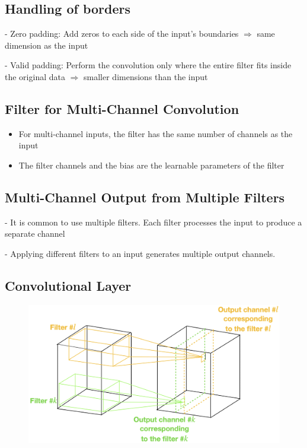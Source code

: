 \subsection*{Handling of borders}
- Zero padding: Add zeros to each side of the input's boundaries $\Rightarrow$ same dimension as the input

- Valid padding: Perform the convolution only where the entire filter fits inside the original data $\Rightarrow$ smaller dimensions than the input

\subsection*{Filter for Multi-Channel Convolution}

\begin{itemize}
  \item For multi-channel inputs, the filter has the same number of channels as the input
  \item The filter channels and the bias are the learnable parameters of the filter
\end{itemize}

\subsection*{Multi-Channel Output from Multiple Filters}
- It is common to use multiple filters. Each filter processes the input to produce a separate channel

- Applying different filters to an input generates multiple output channels.

\subsection*{Convolutional Layer}

\begin{figure} 
    \centering
    \includegraphics[width=0.5\columnwidth]{figures/conv_layer.png}
    \vspace{-10pt}
\end{figure}

